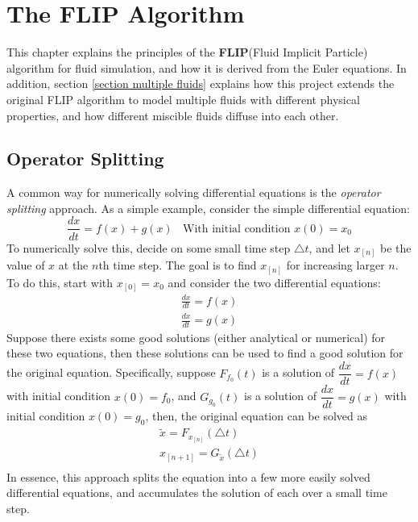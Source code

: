\chapter{The FLIP Algorithm}
\label{chapter grid}

This chapter explains the principles of the \textbf{FLIP}(Fluid Implicit Particle) algorithm for fluid simulation, and how it is derived from the Euler equations. In addition, section \ref{section multiple fluids} explains how this project extends the original FLIP algorithm to model multiple fluids with different physical properties, and how different miscible fluids diffuse into each other.


\section{Operator Splitting}
\label{section splitting}
A common way for numerically solving differential equations is the \textit{operator splitting} approach. As a simple example, consider the simple differential equation:
$$
\frac{dx}{dt} = f(x)+g(x) ~~~~\mbox{With initial condition $x(0)=x_0$}
$$
To numerically solve this, decide on some small time step $\triangle t$, and let $x_{[n]}$ be the value of $x$ at the $n$th time step. The goal is to find $x_{[n]}$ for increasing larger $n$. To do this, start with $x_{[0]}=x_0$ and consider the two differential equations:
\begin{equation*}
    \begin{aligned}
        \frac{dx}{dt} = f(x)\\
        \frac{dx}{dt} = g(x)
    \end{aligned}
\end{equation*}
Suppose there exists some good solutions (either analytical or numerical) for these two equations, then these solutions can be used to find a good solution for the original equation. Specifically, suppose $F_{f_0}(t)$ is a solution of $\dfrac{dx}{dt} = f(x)$ with initial condition $x(0)=f_0$, and $G_{g_0}(t)$ is a solution of $\dfrac{dx}{dt} = g(x)$ with initial condition $x(0)=g_0$, then, the original equation can be solved as 
\begin{equation*}
    \begin{aligned}
        \widetilde{x} = F_{x_{[n]}}(\triangle t) \\
        x_{[n+1]} = G_{\widetilde{x}}(\triangle t) \\
    \end{aligned}
\end{equation*}
In essence, this approach splits the equation into a few more easily solved differential equations, and accumulates the solution of each over a small time step. 

